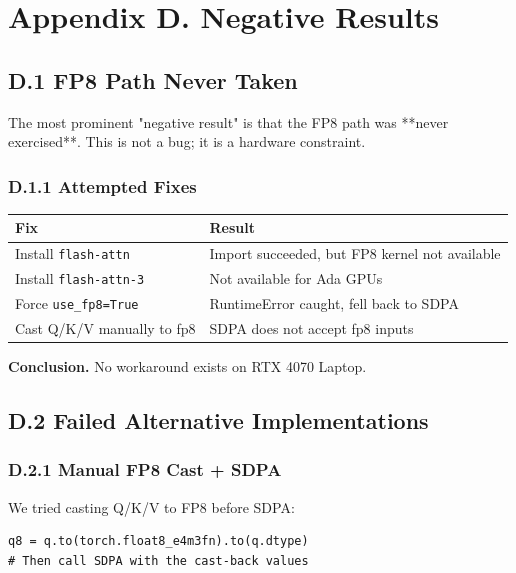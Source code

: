 
\section{Appendix D. Negative Results}

\subsection{D.1 FP8 Path Never Taken}

The most prominent "negative result" is that the FP8 path was **never 
exercised**. This is not a bug; it is a hardware constraint.

\subsubsection{D.1.1 Attempted Fixes}

\begin{table}[H]
\centering
\small
\begin{tabular}{ll}
\toprule
\textbf{Fix} & \textbf{Result} \\
\midrule
Install \texttt{flash-attn} & Import succeeded, but FP8 kernel not available \\
Install \texttt{flash-attn-3} & Not available for Ada GPUs \\
Force \texttt{use\_fp8=True} & RuntimeError caught, fell back to SDPA \\
Cast Q/K/V manually to fp8 & SDPA does not accept fp8 inputs \\
\bottomrule
\end{tabular}
\end{table}

\textbf{Conclusion.} No workaround exists on RTX 4070 Laptop.

\subsection{D.2 Failed Alternative Implementations}

\subsubsection{D.2.1 Manual FP8 Cast + SDPA}

We tried casting Q/K/V to FP8 before SDPA:

\begin{lstlisting}
q8 = q.to(torch.float8_e4m3fn).to(q.dtype)
# Then call SDPA with the cast-back values
\end{lstlisting}

